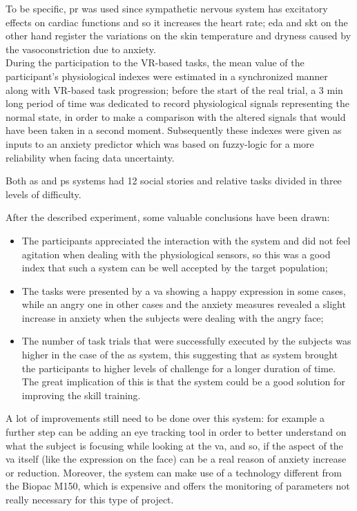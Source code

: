 \documentclass[12pt,journal,draftclsnofoot,onecolumn]{IEEEtran}
\makeatletter
\let\origsubsubsection\subsubsection
\renewcommand\subsubsection{\@ifstar{\starsubsubsection}{\nostarsubsubsection}}
\newcommand\nostarsubsubsection[1]
{\subsubsectionprelude\origsubsubsection{#1}}
\newcommand\subsubsectionprelude{%
  \vspace{6pt}
}
\makeatother
\begin{document}
To be specific, \gls{pr} was used since sympathetic nervous system has excitatory effects on cardiac functions and so it increases the heart rate; \gls{eda} and \gls{skt} on the other hand register the variations on the skin temperature and dryness caused by the vasoconstriction due to anxiety.\\

During the participation to the VR-based tasks, the mean value of the participant's physiological indexes were estimated in a synchronized manner along with VR-based task progression; before the start of the real trial, a 3 min long period of time was dedicated to record physiological signals representing the normal state, in order to make a comparison with the altered signals that would have been taken in a second moment. Subsequently these indexes were given as inputs to an anxiety predictor which was based on fuzzy-logic for a more reliability when facing data uncertainty.

Both \gls{as} and \gls{ps} systems had 12 social stories and relative tasks divided in three levels of difficulty.

\subsubsection{Results}
\label{sec:resultsVR}
After the described experiment, some valuable conclusions have been drawn:
\begin{itemize}
\item The participants appreciated the interaction with the system and did not feel agitation when dealing with the physiological sensors, so this was a good index that such a system can be well accepted by the target population;
\item The tasks were presented by a \gls{va} showing a happy expression in some cases, while an angry one in other cases and the anxiety measures revealed a slight increase in anxiety when the subjects were dealing with the angry face;
\item The number of task trials that were successfully executed by the subjects was higher in the case of the \gls{as} system, this suggesting that \gls{as} system brought the participants to higher levels of challenge for a longer duration of time. The great implication of this is that the system could be a good solution for improving the skill training.
\end{itemize}

A lot of improvements still need to be done over this system: for example a further step can be adding an eye tracking tool in order to better understand on what the subject is focusing while looking at the \gls{va}, and so, if the aspect of the \gls{va} itself (like the expression on the face) can be a real reason of anxiety increase or reduction. Moreover, the system can make use of a technology different from the Biopac M150, which is expensive and offers the monitoring of parameters not really necessary for this type of project.
\end{document}
